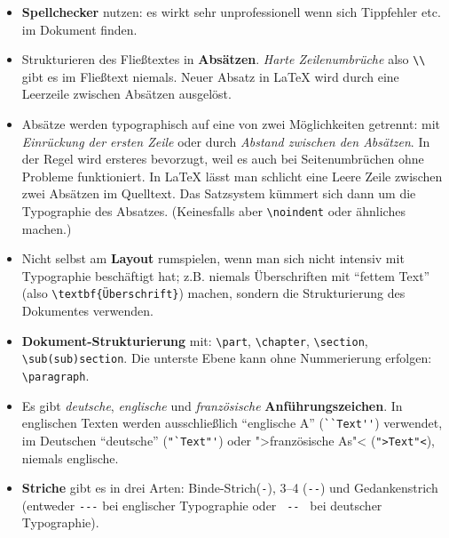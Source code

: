 \documentclass[twoside, a4paper, DIV=11, open=any, bibliography=totoc]{scrbook}
\begin{document}
\begin{itemize}
    \item \textbf{Spellchecker} nutzen: es wirkt sehr unprofessionell wenn sich Tippfehler etc. im Dokument finden.
    \item Strukturieren des Fließtextes in \textbf{Absätzen}. \textit{Harte Zeilenumbrüche} also \verb+\\+ gibt es im Fließtext niemals. Neuer Absatz in \LaTeX{} wird durch eine Leerzeile zwischen Absätzen ausgelöst.
    \item Absätze werden typographisch auf eine von zwei Möglichkeiten getrennt: mit \textit{Einrückung der ersten Zeile} oder durch \textit{Abstand zwischen den Absätzen}. In der Regel wird ersteres bevorzugt, weil es auch bei Seitenumbrüchen ohne Probleme funktioniert. In \LaTeX{} lässt man schlicht eine Leere Zeile zwischen zwei Absätzen im Quelltext. Das Satzsystem kümmert sich dann um die Typographie des Absatzes. (Keinesfalls aber \verb+\noindent+ oder ähnliches machen.)
    \item Nicht selbst am \textbf{Layout} rumspielen, wenn man sich nicht intensiv mit Typographie beschäftigt hat; z.B. niemals Überschriften mit "`fettem Text"' (also \verb+\textbf{Überschrift}+) machen, sondern die Strukturierung des Dokumentes verwenden.
    \item \textbf{Dokument-Strukturierung} mit: \verb+\part+, \verb+\chapter+, \verb+\section+, \verb+\sub(sub)section+. Die unterste Ebene kann ohne Nummerierung erfolgen: \verb+\paragraph+.
    \item Es gibt \textit{deutsche}, \textit{englische} und \textit{französische} \textbf{Anführungszeichen}. In englischen Texten werden ausschließlich ``englische A'' (\verb+``Text''+) verwendet, im Deutschen "`deutsche"' (\verb+"`Text"'+) oder ">französische As"< (\verb+">Text"<+), niemals englische.
    \item \textbf{Striche} gibt es in drei Arten: Binde-Strich(\verb+-+), 3--4 (\verb+--+) und Gedankenstrich (entweder \verb+---+ bei englischer Typographie oder \verb+ -- + bei deutscher Typographie).

\end{itemize}
\end{document}
